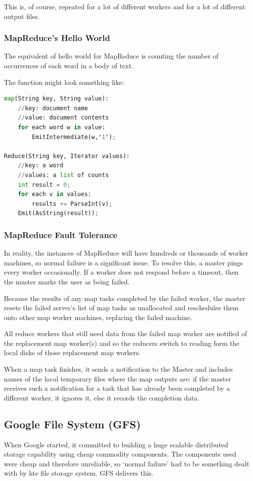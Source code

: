 \documentclass[11pt,a4paper,titlepage,dvipsnames,cmyk]{scrartcl}
\begin{document}
This is, of course, repeated for a lot of different workers and for a lot of different output files.

\subsubsection{MapReduce's Hello World}
The equivalent of hello world for MapReduce is counting the number of occurrences of each word in a body of text.

The function might look something like:
\begin{lstlisting}[language=python]
map(String key, String value):
    //key: document name
    //value: document contents
    for each word w in value:
        EmitIntermediate(w,"1");

Reduce(String key, Iterator values):
    //key: a word
    //values: a list of counts
    int result = 0;
    for each v in values:
        results += ParseInt(v);
    Emit(AsString(result));
\end{lstlisting}

\subsubsection{MapReduce Fault Tolerance}
In reality, the instances of MapReduce will have hundreds or thousands of worker machines, so normal failure is a significant issue. To resolve this, a master pings every worker occasionally. If a worker does not respond before a timeout, then the master marks the user as being failed.

Because the results of any map tasks completed by the failed worker, the master resets the failed server's list of map tasks as unallocated and reschedules them onto other map worker machines, replacing the failed machine.

All reduce workers that still need data from the failed map worker are notified of the replacement map worker(s) and so the reducers switch to reading form the local disks of those replacement map workers.

When a map task finishes, it sends a notification to the Master and includes names of the local temporary files where the map outputs are: if the master receives such a notification for a task that has already been completed by a different worker, it ignores it, else it records the completion data.

\subsection{Google File System (GFS)}
When Google started, it committed to building a huge scalable distributed storage capability using cheap commodity components. The components used were cheap and therefore unreliable, so `normal failure' had to be something dealt with by hte file storage system. GFS delivers this.
\end{document}
